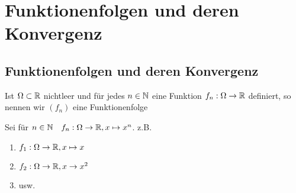 \section{Funktionenfolgen und deren Konvergenz}
\subsection{Funktionenfolgen und deren Konvergenz}
Ist $ \Omega \subset \mathbb{R}  $ nichtleer und für jedes $ n \in \mathbb{N}  $ eine Funktion $ f_n : \Omega \to \mathbb{R}  $ definiert, so nennen wir $ (f_n) $ eine Funktionenfolge

\begin{subexample}
	Sei für $ n \in \mathbb{N} \quad f_n : \Omega \to \mathbb{R} , x \mapsto x^n $. z.B.
	\begin{enumerate}[label=\arabic*.]
		\item $ f_1: \Omega \to \mathbb{R} , x \mapsto x $ 
		\item $ f_2: \Omega \to \mathbb{R} , x \to x^2 $
		\item usw.
	\end{enumerate}
\end{subexample}

